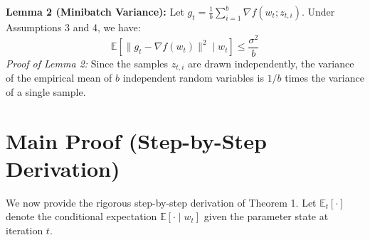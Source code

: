 \documentclass{article}
\begin{document}
\textbf{Lemma 2 (Minibatch Variance):} Let $g_t = \frac{1}{b} \sum_{i=1}^b \nabla f(w_t; z_{t,i})$. Under Assumptions 3 and 4, we have:
\begin{equation}
    \mathbb{E}[\|g_t - \nabla f(w_t)\|^2 \mid w_t] \leq \frac{\sigma^2}{b}
\end{equation}
\textit{Proof of Lemma 2:} Since the samples $z_{t,i}$ are drawn independently, the variance of the empirical mean of $b$ independent random variables is $1/b$ times the variance of a single sample.

\section*{Main Proof (Step-by-Step Derivation)}

We now provide the rigorous step-by-step derivation of Theorem 1. Let $\mathbb{E}_t[\cdot]$ denote the conditional expectation $\mathbb{E}[\cdot \mid w_t]$ given the parameter state at iteration $t$.
\end{document}

